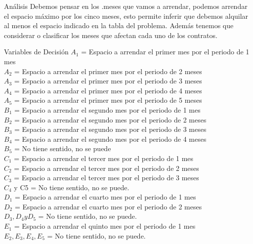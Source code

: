 \documentclass{beamer}
\begin{document}
\begin{frame}[fragile]{Análisis}
Debemos pensar en los .meses que vamos a arrendar, podemos arrendar el espacio máximo por los cinco meses, esto permite inferir que debemos alquilar al menos el espacio indicado en la tabla del problema. Además tenemos que considerar o clasificar los meses que afectan cada uno de los contratos.

\end{frame}
\begin{frame}[fragile]{Variables de Decisión}
\(A_{1}\) = Espacio a arrendar el primer mes por el periodo de 1 mes\\
\(A_{2}\) = Espacio a arrendar el primer mes por el periodo de 2 meses\\
\(A_{3}\) = Espacio a arrendar el primer mes por el periodo de 3 meses\\
\(A_{4}\) = Espacio a arrendar el primer mes por el periodo de 4 meses\\
\(A_{5}\) = Espacio a arrendar el primer mes por el periodo de 5 meses\\
\(B_{1}\) = Espacio a arrendar el segundo mes por el periodo de 1 mes\\
\(B_{2}\) = Espacio a arrendar el segundo mes por el periodo de 2 meses\\
\(B_{3}\) = Espacio a arrendar el segundo mes por el periodo de 3 meses\\
\(B_{4}\) = Espacio a arrendar el segundo mes por el periodo de 4 meses\\
\(B_{5}\) = No tiene sentido, no se puede\\
\(C_{1}\) = Espacio a arrendar el tercer mes por el periodo de 1 mes\\
\(C_{2}\) = Espacio a arrendar el tercer mes por el periodo de 2 meses\\
\(C_{3}\) = Espacio a arrendar el tercer mes por el periodo de 3 meses\\
\(C_{4}\) y C5 =  No tiene sentido, no se puede.\\
\(D_{1}\) = Espacio a arrendar el cuarto mes por el periodo de 1 mes\\
\(D_{2}\) = Espacio a arrendar el cuarto mes por el periodo de 2 meses\\
\(D_{3}, D_{4} y D_{5}\) =  No tiene sentido, no se puede.\\
\(E_{1}\) = Espacio a arrendar el quinto mes por el periodo de 1 mes\\
\(E_{2} , E_{3}, E_{4}, E_{5}\) =  No tiene sentido, no se puede.\\

\end{frame}
\end{document}
